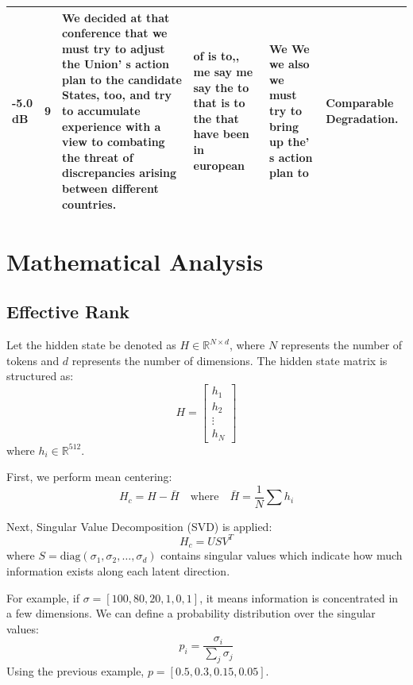 \documentclass[twocolumn]{article}
\begin{document}
\begin{table}[t]
\begin{tabular}{p{0.8cm} p{0.3cm} p{4.2cm} p{3.2cm} p{4.2cm} p{2.5cm}}
-5.0 dB & 9 & We decided at that conference that we must try to adjust the Union' s action plan to the candidate States, too, and try to accumulate experience with a view to combating the threat of discrepancies arising between different countries. & of is to,, me say me say the to that is to the that have been in european & We We we also we must try to bring up the' s action plan to & Comparable Degradation. \\
\bottomrule
\end{tabular}
\end{table}

\section{\large \textbf{Mathematical Analysis}}

\subsection{\textbf{Effective Rank}}
Let the hidden state be denoted as $H \in \mathbb{R}^{N \times d}$, where $N$ represents the number of tokens and $d$ represents the number of dimensions. The hidden state matrix is structured as:
\begin{equation}
    H = \begin{bmatrix} h_1 \\ h_2 \\ \vdots \\ h_N \end{bmatrix}
\end{equation}
where $h_i \in \mathbb{R}^{512}$.

First, we perform mean centering:
\begin{equation}
    H_c = H - \bar{H} \quad \text{where} \quad \bar{H} = \frac{1}{N} \sum h_i
\end{equation}

Next, Singular Value Decomposition (SVD) is applied:
\begin{equation}
    H_c = U S V^T
\end{equation}
where $S = \text{diag}(\sigma_1, \sigma_2, \dots, \sigma_d)$ contains singular values which indicate how much information exists along each latent direction. 

For example, if $\sigma = [100, 80, 20, 1, 0, 1]$, it means information is concentrated in a few dimensions. We can define a probability distribution over the singular values:
\begin{equation}
    p_i = \frac{\sigma_i}{\sum_j \sigma_j}
\end{equation}
Using the previous example, $p = [0.5, 0.3, 0.15, 0.05]$. 
\end{document}
